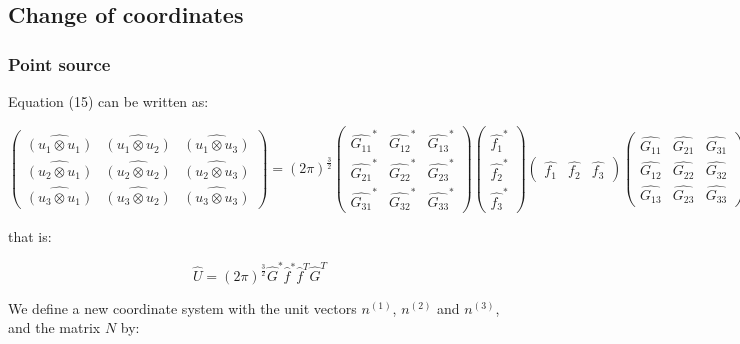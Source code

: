 \documentclass[methods.tex]{subfiles}
\begin{document}
\subsection{Change of coordinates}

\subsubsection{Point source}

Equation (15) can be written as:

\begin{equation}
\begin{pmatrix}
\hat{(u_1 \otimes u_1)} & \hat{(u_1 \otimes u_2)} & \hat{(u_1 \otimes u_3)} \\
\hat{(u_2 \otimes u_1)} & \hat{(u_2 \otimes u_2)} & \hat{(u_2 \otimes u_3)} \\
\hat{(u_3 \otimes u_1)} & \hat{(u_3 \otimes u_2)} & \hat{(u_3 \otimes u_3)}
\end{pmatrix} = (2 \pi)^{\frac{3}{2}}
\begin{pmatrix}
\hat{G_{11}}^* & \hat{G_{12}}^* & \hat{G_{13}}^* \\
\hat{G_{21}}^* & \hat{G_{22}}^* & \hat{G_{23}}^* \\
\hat{G_{31}}^* & \hat{G_{32}}^* & \hat{G_{33}}^*
\end{pmatrix}
\begin{pmatrix}
\hat{f_1}^* \\
\hat{f_2}^* \\
\hat{f_3}^*
\end{pmatrix}
\begin{pmatrix}
\hat{f_1} & \hat{f_2} & \hat{f_3}
\end{pmatrix}
\begin{pmatrix}
\hat{G_{11}} & \hat{G_{21}} & \hat{G_{31}} \\
\hat{G_{12}} & \hat{G_{22}} & \hat{G_{32}} \\
\hat{G_{13}} & \hat{G_{23}} & \hat{G_{33}}
\end{pmatrix}
\end{equation}

that is:

\begin{equation}
\hat{U} = (2 \pi)^{\frac{3}{2}} \hat{G}^* \hat{f}^* \hat{f}^T \hat{G}^T
\end{equation}

We define a new coordinate system with the unit vectors $n^{(1)}$, $n^{(2)}$ and $n^{(3)}$, and the matrix $N$ by:
\end{document}
